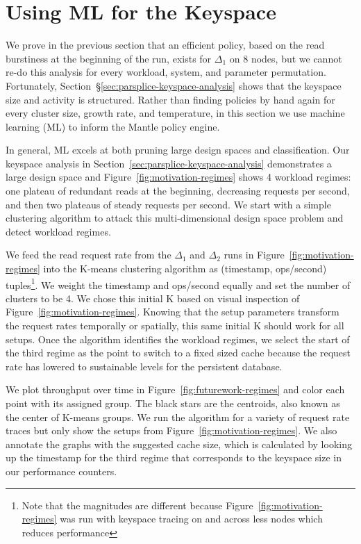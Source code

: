 \section{Using ML for the Keyspace}
\label{sec:ml-for-the-keyspace}

We prove in the previous section that an efficient policy, based on the read
burstiness at the beginning of the run,  exists for \(\Delta_1\) on 8 nodes,
but we cannot re-do this analysis for every workload, system, and parameter
permutation.  Fortunately, Section~\S\ref{sec:parsplice-keyspace-analysis}
shows that the keyspace size and activity is structured. Rather than finding
policies by hand again for every cluster size, growth rate, and temperature, in
this section we use machine learning (ML) to inform the Mantle policy engine.

In general, ML excels at both pruning large design spaces and classification.
Our keyspace analysis in Section~\ref{sec:parsplice-keyspace-analysis}
demonstrates a large design space and Figure~\ref{fig:motivation-regimes} shows
4 workload regimes: one plateau of redundant reads at the beginning, decreasing
requests per second, and then two plateaus of steady requests per second. We
start with a simple clustering algorithm to attack this multi-dimensional
design space problem and detect workload regimes.

We feed the read request rate from the \(\Delta_1\) and \(\Delta_2\) runs in
Figure~\ref{fig:motivation-regimes} into the K-means clustering algorithm as
(timestamp, ops/second) tuples\footnote{Note that the magnitudes are different
because Figure~\ref{fig:motivation-regimes} was run with keyspace tracing on
and across less nodes which reduces performance}. We weight the timestamp and
ops/second equally and set the number of clusters to be 4.  We chose this
initial K  based on visual inspection of Figure~\ref{fig:motivation-regimes}.
Knowing that the setup parameters transform the request rates temporally or
spatially, this same initial K should work for all setups. Once the algorithm
identifies the workload regimes, we select the start of the third regime as the
point to switch to a fixed sized cache because the request rate has lowered to
sustainable levels for the persistent database.

We plot throughput over time in Figure~\ref{fig:futurework-regimes} and
color each point with its assigned group. The black stars are the centroids,
also known as the center of K-means groups.  We run the algorithm for a variety
of request rate traces but only show the setups from
Figure~\ref{fig:motivation-regimes}. We also annotate the graphs with the
suggested cache size, which is calculated by looking up the timestamp for the
third regime that corresponds to the keyspace size in our performance counters.

